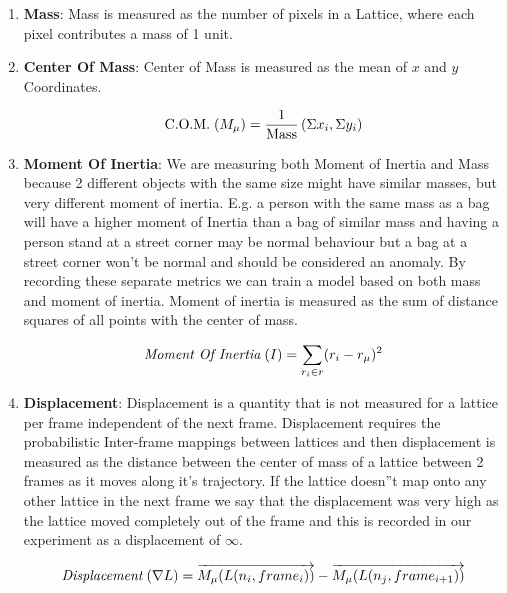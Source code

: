\documentclass{article}
\begin{document}
\begin{enumerate}
    \item \textbf{Mass}: Mass is measured as the number of pixels in a Lattice, where each pixel contributes a mass of 1 unit.
    
    \item \textbf{Center Of Mass}: Center of Mass is measured as the mean of $x$ and $y$ Coordinates.
    
    \begin{align*}
        \text{C.O.M.} \hspace{.1cm} (M_{\mu}) = \frac{1}{\text{Mass}} \left( \Sigma x_i, \Sigma y_i \right)
    \end{align*}
    
    \item \textbf{Moment Of Inertia}: We are measuring both Moment of Inertia and Mass because 2 different objects with the same size might have similar masses, but very different moment of inertia. E.g. a person with the same mass as a bag will have a higher moment of Inertia than a bag of similar mass and having a person stand at a street corner may be normal behaviour but a bag at a street corner won't be normal and should be considered an anomaly. By recording these separate metrics we can train a model based on both mass and moment of inertia. Moment of inertia is measured as the sum of distance squares of all points with the center of mass.
    
    \begin{align*}
        \textit{Moment Of Inertia} \hspace{.1cm} (I) =  \sum \limits_{r_i \in r} (r_i - r_{\mu}) ^ 2
    \end{align*}
    
    \item \textbf{Displacement}: Displacement is a quantity that is not measured for a lattice per frame independent of the next frame. Displacement requires the probabilistic Inter-frame mappings between lattices and then displacement is measured as the distance between the center of mass of a lattice between 2 frames as it moves along it's trajectory. If the lattice doesn''t map onto any other lattice in the next frame we say that the displacement was very high as the lattice moved completely out of the frame and this is recorded in our experiment as a displacement of $\infty$.
    
    \begin{align*}
        \textit{Displacement} \hspace{.1cm} (\nabla L) = \overrightarrow{M_{\mu}(L(n_i, frame_i))} - \overrightarrow{M_{\mu}(L(n_j, frame_{i + 1}))}
    \end{align*}
    

\end{enumerate}
\end{document}
